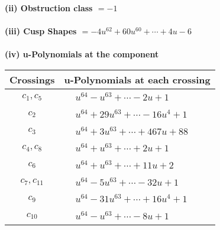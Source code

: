 \documentclass[1p]{elsarticle_modified}
\theoremstyle{definition}
\begin{document}
\flushleft \textbf{(ii) Obstruction class $= -1$}\\~\\
\flushleft \textbf{(iii) Cusp Shapes $= -4 u^{62}+60 u^{60}+\cdots+4 u-6$}\\~\\
\newpage\renewcommand{\arraystretch}{1}
\flushleft \textbf{(iv) u-Polynomials at the component}\newline \\
\begin{tabular}{m{50pt}|m{274pt}}
Crossings & \hspace{64pt}u-Polynomials at each crossing \\
\hline $$\begin{aligned}c_{1},c_{5}\end{aligned}$$&$\begin{aligned}
&u^{64}- u^{63}+\cdots-2 u+1
\end{aligned}$\\
\hline $$\begin{aligned}c_{2}\end{aligned}$$&$\begin{aligned}
&u^{64}+29 u^{63}+\cdots-16 u^4+1
\end{aligned}$\\
\hline $$\begin{aligned}c_{3}\end{aligned}$$&$\begin{aligned}
&u^{64}+3 u^{63}+\cdots+467 u+88
\end{aligned}$\\
\hline $$\begin{aligned}c_{4},c_{8}\end{aligned}$$&$\begin{aligned}
&u^{64}+u^{63}+\cdots+2 u+1
\end{aligned}$\\
\hline $$\begin{aligned}c_{6}\end{aligned}$$&$\begin{aligned}
&u^{64}+u^{63}+\cdots+11 u+2
\end{aligned}$\\
\hline $$\begin{aligned}c_{7},c_{11}\end{aligned}$$&$\begin{aligned}
&u^{64}-5 u^{63}+\cdots-32 u+1
\end{aligned}$\\
\hline $$\begin{aligned}c_{9}\end{aligned}$$&$\begin{aligned}
&u^{64}-31 u^{63}+\cdots+16 u^4+1
\end{aligned}$\\
\hline $$\begin{aligned}c_{10}\end{aligned}$$&$\begin{aligned}
&u^{64}- u^{63}+\cdots-8 u+1
\end{aligned}$\\
\hline
\end{tabular}\\~\\
\end{document}
